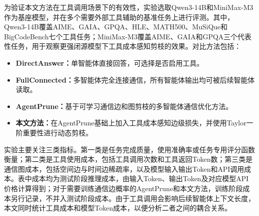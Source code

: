 为验证本文方法在工具调用场景下的有效性，实验选取Qwen3-14B和MiniMax-M3\cite{ref60}作为基座模型，并在多个需要外部工具辅助的基准任务上进行评测。其中，Qwen3-14B覆盖AIME、GAIA、GPQA、HLE、MATH500、MuSiQue和BigCodeBench七个工具任务；MiniMax-M3覆盖AIME、GAIA和GPQA三个代表性任务，用于观察更强闭源模型下工具成本感知剪枝的效果。对比方法包括：

\begin{itemize}[topsep=0pt,itemsep=0pt,parsep=0pt,partopsep=0pt]
  \item \textbf{DirectAnswer：}单智能体直接回答，可选择是否启用工具。
  \item \textbf{FullConnected：}多智能体完全连接通信，所有智能体输出均可被后续智能体读取。
  \item \textbf{AgentPrune：}基于可学习通信边和图剪枝的多智能体通信优化方法。
  \item \textbf{本文方法：}在AgentPrune基础上加入工具成本感知边级损失，并使用Taylor一阶重要性进行动态剪枝。
\end{itemize}

实验主要关注三类指标。第一类是任务完成质量，使用准确率或任务专用评分函数衡量；第二类是工具使用成本，包括工具调用次数和工具返回Token数；第三类是通信图成本，包括空间边与时间边稀疏率，以及模型输入输出Token和API调用成本。表中成本均为测试阶段推理成本，由输入Token、输出Token及对应模型API价格计算得到；对于需要训练通信边概率的AgentPrune和本文方法，训练阶段成本另行记录，不并入测试阶段成本。由于工具调用会影响后续智能体上下文长度，本文同时统计工具成本和模型Token成本，以便分析二者之间的耦合关系。

\begin{table}[H]
  \centering
  \caption{工具调用实验任务与默认工具配置}
  \label{tab:tool-aware-datasets}
\end{table}

